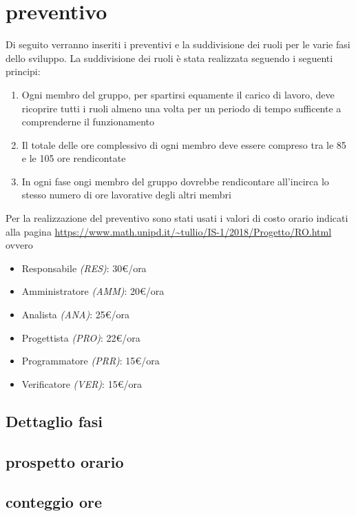 	\section{preventivo}
	Di seguito verranno inseriti i preventivi e la suddivisione dei ruoli per le varie fasi dello sviluppo. La suddivisione dei ruoli è stata realizzata seguendo i seguenti principi:
	\begin{enumerate}
		\item Ogni membro del gruppo, per spartirsi equamente il carico di lavoro, deve ricoprire tutti i ruoli almeno una volta per un periodo di tempo sufficente a comprenderne il funzionamento
		\item Il totale delle ore complessivo di ogni membro deve essere compreso tra le 85 e le 105 ore rendicontate
		\item In ogni fase ongi membro del gruppo dovrebbe rendicontare all'incirca lo stesso numero di ore lavorative degli altri membri
	\end{enumerate} 

	Per la realizzazione del preventivo sono stati usati i valori di costo orario indicati alla pagina \url{https://www.math.unipd.it/~tullio/IS-1/2018/Progetto/RO.html} ovvero
	\begin{itemize}
		\item Responsabile \textit{(RES)}: 30\euro/ora
		\item Amministratore \textit{(AMM)}: 20\euro/ora
		\item Analista \textit{(ANA)}: 25\euro/ora
		\item Progettista \textit{(PRO)}: 22\euro/ora
		\item Programmatore \textit{(PRR)}: 15\euro/ora
		\item Verificatore \textit{(VER)}: 15\euro/ora
	\end{itemize}	
		\subsection{Dettaglio fasi}
		\subsection{prospetto orario}
		\subsection{conteggio ore}
